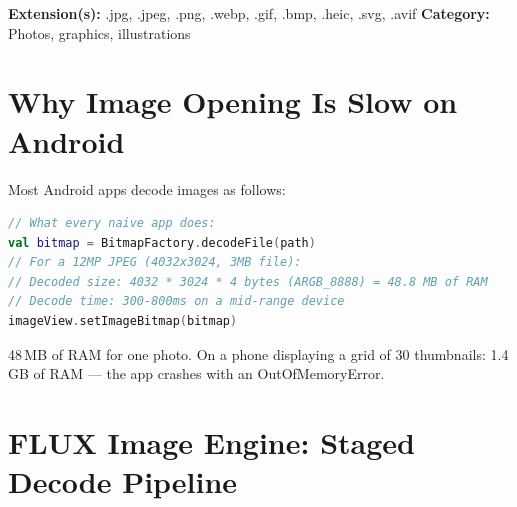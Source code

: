 \documentclass[11pt, a4paper, openright]{report}
\newcommand{\filesection}[3]{%
  \begin{insightbox}[title={File Type Overview: #1}]
  \textbf{Extension(s):} #2 \quad \textbf{Category:} #3
  \end{insightbox}
}
\begin{document}
\filesection{Images}{.jpg, .jpeg, .png, .webp, .gif, .bmp, .heic, .svg, .avif}{Photos, graphics, illustrations}

\section{Why Image Opening Is Slow on Android}

Most Android apps decode images as follows:

\begin{lstlisting}[language=Kotlin, caption=The Wrong Way -- Full Decode]
// What every naive app does:
val bitmap = BitmapFactory.decodeFile(path)
// For a 12MP JPEG (4032x3024, 3MB file):
// Decoded size: 4032 * 3024 * 4 bytes (ARGB_8888) = 48.8 MB of RAM
// Decode time: 300-800ms on a mid-range device
imageView.setImageBitmap(bitmap)
\end{lstlisting}

48\,MB of RAM for one photo. On a phone displaying a grid of 30 thumbnails: 1.4\,GB of RAM --- the app crashes with an OutOfMemoryError.

\section{FLUX Image Engine: Staged Decode Pipeline}
\end{document}
